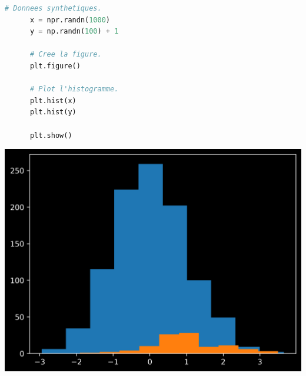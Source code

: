 \documentclass[aspectratio=169]{beamer}
\begin{document}
\begin{frame}[fragile]{}{}
  \vfill
  \begin{minipage}{.48\textwidth}
    \begin{lstlisting}[language=Python]
      # Donnees synthetiques.
      x = npr.randn(1000)
      y = np.randn(100) + 1

      # Cree la figure.
      plt.figure()

      # Plot l'histogramme.
      plt.hist(x)
      plt.hist(y)

      plt.show()
    \end{lstlisting}
  \end{minipage}%
  \hfill
  \begin{minipage}{.48\textwidth}
    \centering
    \includegraphics[width=\textwidth]{hist_plot_multi}
  \end{minipage}
  \vfill
\end{frame}
\end{document}
